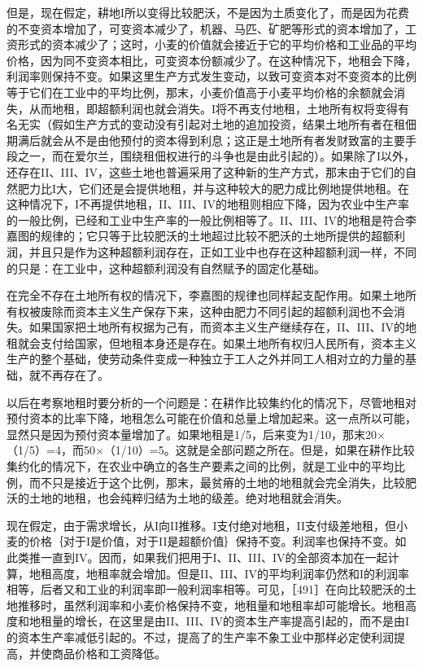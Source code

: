 但是，现在假定，耕地I所以变得比较肥沃，不是因为土质变化了，而是因为花费的不变资本增加了，可变资本减少了，机器、马匹、矿肥等形式的资本增加了，工资形式的资本减少了；这时，小麦的价值就会接近于它的平均价格和工业品的平均价格，因为同不变资本相比，可变资本份额减少了。在这种情况下，地租会下降，利润率则保持不变。如果这里生产方式发生变动，以致可变资本对不变资本的比例等于它们在工业中的平均比例，那末，小麦价值高于小麦平均价格的余额就会消失，从而地租，即超额利润也就会消失。I将不再支付地租，土地所有权将变得有名无实（假如生产方式的变动没有引起对土地的追加投资，结果土地所有者在租佃期满后就会从不是由他预付的资本得到利息；这正是土地所有者发财致富的主要手段之一，而在爱尔兰，围绕租佃权进行的斗争也是由此引起的）。如果除了I以外，还存在II、III、IV，这些土地也普遍采用了这种新的生产方式，那末由于它们的自然肥力比I大，它们还是会提供地租，并与这种较大的肥力成比例地提供地租。在这种情况下，I不再提供地租，II、III、IV的地租则相应下降，因为农业中生产率的一般比例，已经和工业中生产率的一般比例相等了。II、III、IV的地租是符合李嘉图的规律的；它只等于比较肥沃的土地超过比较不肥沃的土地所提供的超额利润，并且只是作为这种超额利润存在，正如工业中也存在这种超额利润一样，不同的只是：在工业中，这种超额利润没有自然赋予的固定化基础。

在完全不存在土地所有权的情况下，李嘉图的规律也同样起支配作用。如果土地所有权被废除而资本主义生产保存下来，这种由肥力不同引起的超额利润也不会消失。如果国家把土地所有权据为己有，而资本主义生产继续存在，II、III、IV的地租就会支付给国家，但地租本身还是存在。如果土地所有权归人民所有，资本主义生产的整个基础，使劳动条件变成一种独立于工人之外并同工人相对立的力量的基础，就不再存在了。

以后在考察地租时要分析的一个问题是：在耕作比较集约化的情况下，尽管地租对预付资本的比率下降，地租怎么可能在价值和总量上增加起来。这一点所以可能，显然只是因为预付资本量增加了。如果地租是1/5，后来变为1/10，那末20×（1/5）=4，而50×（1/10）=5。这就是全部问题之所在。但是，如果在耕作比较集约化的情况下，在农业中确立的各生产要素之间的比例，就是工业中的平均比例，而不只是接近于这个比例，那末，最贫瘠的土地的地租就会完全消失，比较肥沃的土地的地租，也会纯粹归结为土地的级差。绝对地租就会消失。

现在假定，由于需求增长，从I向II推移。I支付绝对地租，II支付级差地租，但小麦的价格｛对于I是价值，对于II是超额价值｝保持不变。利润率也保持不变。如此类推一直到IV。因而，如果我们把用于I、II、III、IV的全部资本加在一起计算，地租高度，地租率就会增加。但是II、III、IV的平均利润率仍然和I的利润率相等，后者又和工业的利润率即一般利润率相等。可见，［491］在向比较肥沃的土地推移时，虽然利润率和小麦价格保持不变，地租量和地租率却可能增长。地租高度和地租量的增长，在这里是由II、III、IV的资本生产率提高引起的，而不是由I的资本生产率减低引起的。不过，提高了的生产率不象工业中那样必定使利润提高，并使商品价格和工资降低。

